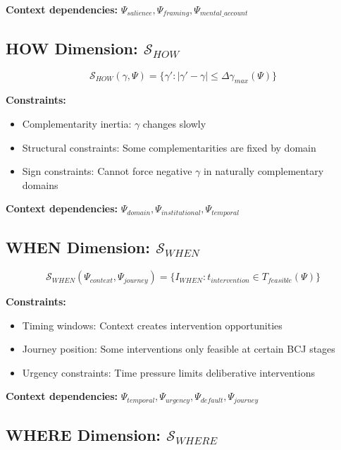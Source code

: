 \textbf{Context dependencies:} $\Psi_{salience}, \Psi_{framing}, \Psi_{mental\_account}$

\subsection{HOW Dimension: $\mathcal{S}_{HOW}$}

\begin{equation}
\mathcal{S}_{HOW}(\gamma, \Psi) = \{\gamma' : |\gamma' - \gamma| \leq \Delta\gamma_{max}(\Psi)\}
\end{equation}

\textbf{Constraints:}
\begin{itemize}
    \item Complementarity inertia: $\gamma$ changes slowly
    \item Structural constraints: Some complementarities are fixed by domain
    \item Sign constraints: Cannot force negative $\gamma$ in naturally complementary domains
\end{itemize}

\textbf{Context dependencies:} $\Psi_{domain}, \Psi_{institutional}, \Psi_{temporal}$

\subsection{WHEN Dimension: $\mathcal{S}_{WHEN}$}

\begin{equation}
\mathcal{S}_{WHEN}(\Psi_{context}, \Psi_{journey}) = \{I_{WHEN} : t_{intervention} \in T_{feasible}(\Psi)\}
\end{equation}

\textbf{Constraints:}
\begin{itemize}
    \item Timing windows: Context creates intervention opportunities
    \item Journey position: Some interventions only feasible at certain BCJ stages
    \item Urgency constraints: Time pressure limits deliberative interventions
\end{itemize}

\textbf{Context dependencies:} $\Psi_{temporal}, \Psi_{urgency}, \Psi_{default}, \Psi_{journey}$

\subsection{WHERE Dimension: $\mathcal{S}_{WHERE}$}

